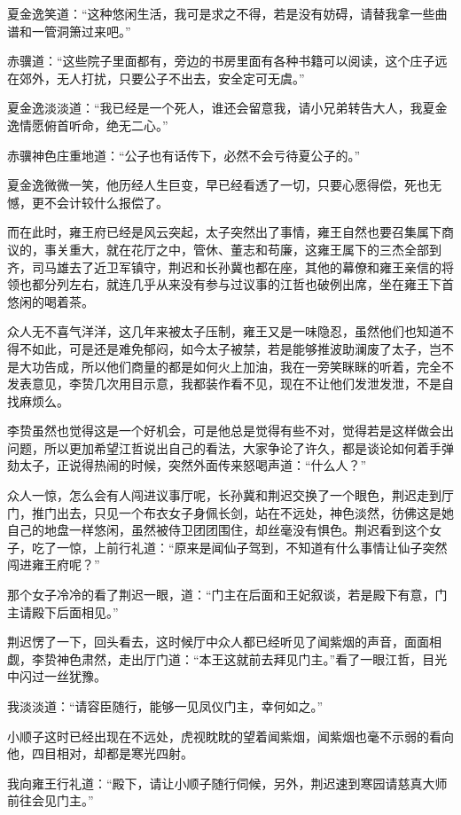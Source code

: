 夏金逸笑道：“这种悠闲生活，我可是求之不得，若是没有妨碍，请替我拿一些曲谱和一管洞箫过来吧。”

赤骥道：“这些院子里面都有，旁边的书房里面有各种书籍可以阅读，这个庄子远在郊外，无人打扰，只要公子不出去，安全定可无虞。”

夏金逸淡淡道：“我已经是一个死人，谁还会留意我，请小兄弟转告大人，我夏金逸情愿俯首听命，绝无二心。”

赤骥神色庄重地道：“公子也有话传下，必然不会亏待夏公子的。”

夏金逸微微一笑，他历经人生巨变，早已经看透了一切，只要心愿得偿，死也无憾，更不会计较什么报偿了。

而在此时，雍王府已经是风云突起，太子突然出了事情，雍王自然也要召集属下商议的，事关重大，就在花厅之中，管休、董志和苟廉，这雍王属下的三杰全部到齐，司马雄去了近卫军镇守，荆迟和长孙冀也都在座，其他的幕僚和雍王亲信的将领也都分列左右，就连几乎从来没有参与过议事的江哲也破例出席，坐在雍王下首悠闲的喝着茶。

众人无不喜气洋洋，这几年来被太子压制，雍王又是一味隐忍，虽然他们也知道不得不如此，可是还是难免郁闷，如今太子被禁，若是能够推波助澜废了太子，岂不是大功告成，所以他们商量的都是如何火上加油，我在一旁笑眯眯的听着，完全不发表意见，李贽几次用目示意，我都装作看不见，现在不让他们发泄发泄，不是自找麻烦么。

李贽虽然也觉得这是一个好机会，可是他总是觉得有些不对，觉得若是这样做会出问题，所以更加希望江哲说出自己的看法，大家争论了许久，都是谈论如何着手弹劾太子，正说得热闹的时候，突然外面传来怒喝声道：“什么人？”

众人一惊，怎么会有人闯进议事厅呢，长孙冀和荆迟交换了一个眼色，荆迟走到厅门，推门出去，只见一个布衣女子身佩长剑，站在不远处，神色淡然，彷佛这是她自己的地盘一样悠闲，虽然被侍卫团团围住，却丝毫没有惧色。荆迟看到这个女子，吃了一惊，上前行礼道：“原来是闻仙子驾到，不知道有什么事情让仙子突然闯进雍王府呢？”

那个女子冷冷的看了荆迟一眼，道：“门主在后面和王妃叙谈，若是殿下有意，门主请殿下后面相见。”

荆迟愣了一下，回头看去，这时候厅中众人都已经听见了闻紫烟的声音，面面相觑，李贽神色肃然，走出厅门道：“本王这就前去拜见门主。”看了一眼江哲，目光中闪过一丝犹豫。

我淡淡道：“请容臣随行，能够一见凤仪门主，幸何如之。”

小顺子这时已经出现在不远处，虎视眈眈的望着闻紫烟，闻紫烟也毫不示弱的看向他，四目相对，却都是寒光四射。

我向雍王行礼道：“殿下，请让小顺子随行伺候，另外，荆迟速到寒园请慈真大师前往会见门主。”


